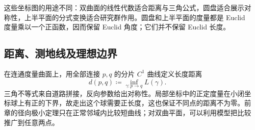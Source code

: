 这些坐标图的用途不同：双曲面的线性代数适合距离与三角公式，圆盘适合展示对称性，上半平面的分式变换适合研究群作用。圆盘和上半平面的度量都是 Euclid 度量乘以一个正函数，因而保留 Euclid 角度；它们并不保留 Euclid 长度。

\subsection{距离、测地线及理想边界}
\label{g1:subsec:1001:03}

在连通度量曲面上，用全部连接 \(p,q\) 的分片 \(C^1\) 曲线定义长度距离
\[
	d(p,q)\coloneqq\inf_{\gamma:p\to q}L(\gamma).
\]
三角不等式来自道路拼接，反向参数给出对称性。局部坐标中的正定度量在小闭坐标球上有正的下界，故走出这个球需要正长度，这也保证不同点的距离不为零。前章的径向极小定理只在正常邻域内比较短曲线；对双曲平面，可以利用模型把比较推广到任意两点。


